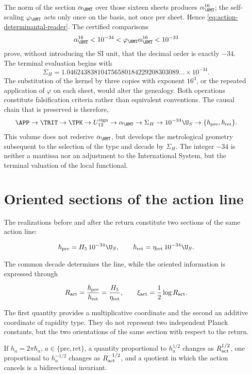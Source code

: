The norm of the section \(\alpha_{\HMT}\) over those sixteen sheets
produces \(\alpha_{\HMT}^{16}\); the self-scaling \(\varphi_{\HMT}\) acts
only once on the basis, not once per sheet. Hence
\cref{eq:action-determinantal-reader}. The certified comparisons
\begin{equation}
\alpha_{\HMT}^{16}<10^{-34}
<\varphi_{\HMT}\alpha_{\HMT}^{16}<10^{-33}
\label{eq:action-decade-bounds}
\end{equation}
prove, without introducing the SI unit, that the decimal order is
exactly \(-34\). The terminal evaluation begins with
\begin{equation}
\Sigma_H
=1.046243838104756580184229208303089\ldots\times10^{-34}.
\label{eq:action-sigma-value}
\end{equation}
The substitution of the kernel by three copies with exponent \(16^3\), or the repeated application of \(\varphi\) on each sheet, would alter the genealogy. Both operations constitute falsification criteria rather than equivalent conventions. The causal chain that is preserved is therefore,
\[
\APP\to\TRIT\to\TPK\to U_{12}^{\rm sign}
\to\alpha_{\HMT}\to\Sigma_H
\to10^{-34}\U_S\to
\{\hbar_{\rm pre},\hbar_{\rm ret}\}.
\]
This volume does not rederive \(\alpha_{\HMT}\), but develops the metrological geometry
subsequent to the selection of the type and decade by
\(\Sigma_H\). The integer \(-34\) is neither a mantissa nor an adjustment to the International
System, but the terminal valuation of the local functional.

\section{Oriented sections of the action line}

The realizations before and after the return constitute two sections
of the same action line:

\begin{equation}
\hbar_{\rm pre}=H_5\,10^{-34}\U_S,\qquad
\hbar_{\rm ret}=\eta_{\rm ret}\,10^{-34}\U_S.
\label{eq:action-twoway}
\end{equation}

The common decade determines the line, while the oriented
information is expressed through

\begin{equation}
R_{\rm act}=\frac{\hbar_{\rm pre}}{\hbar_{\rm ret}}
=\frac{H_5}{\eta_{\rm ret}},
\qquad
\xi_{\rm act}=\frac12\log R_{\rm act}.
\label{eq:action-rapidity}
\end{equation}

The first quantity provides a multiplicative coordinate and the second
an additive coordinate of rapidity type. They do not represent two independent
Planck constants, but the two orientations of the same section
with respect to the return.

If \(h_a=2\pi\hbar_a\), \(a\in\{\mathrm{pre},\mathrm{ret}\}\), a quantity proportional to \(h_a^{1/2}\) changes as \(R_{\rm act}^{1/2}\), one proportional to \(h_a^{-1/2}\) changes as \(R_{\rm act}^{-1/2}\), and a quotient in which the action cancels is a bidirectional invariant.

